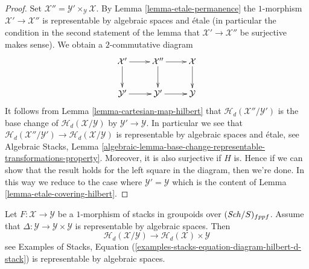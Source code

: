 \begin{proof}
Set $\mathcal{X}'' = \mathcal{Y}' \times_\mathcal{Y} \mathcal{X}$. By
Lemma \ref{lemma-etale-permanence}
the $1$-morphism $\mathcal{X}' \to \mathcal{X}''$ is representable by
algebraic spaces and \'etale (in particular the condition in the second
statement of the lemma that $\mathcal{X}' \to \mathcal{X}''$ be surjective
makes sense). We obtain a $2$-commutative diagram
$$
\xymatrix{
\mathcal{X}' \ar[r] \ar[d] &
\mathcal{X}'' \ar[r] \ar[d] &
\mathcal{X} \ar[d] \\
\mathcal{Y}' \ar[r] &
\mathcal{Y}' \ar[r] &
\mathcal{Y}
}
$$
It follows from
Lemma \ref{lemma-cartesian-map-hilbert}
that $\mathcal{H}_d(\mathcal{X}''/\mathcal{Y}')$ is the base change
of $\mathcal{H}_d(\mathcal{X}/\mathcal{Y})$ by $\mathcal{Y}' \to \mathcal{Y}$.
In particular we see that
$\mathcal{H}_d(\mathcal{X}''/\mathcal{Y}') \to
\mathcal{H}_d(\mathcal{X}/\mathcal{Y})$ is
representable by algebraic spaces and \'etale, see
Algebraic Stacks, Lemma
\ref{algebraic-lemma-base-change-representable-transformations-property}.
Moreover, it is also surjective if $H$ is.
 Hence if we can show that
the result holds for the left square in the diagram, then we're done.
In this way we reduce to the case where $\mathcal{Y}' = \mathcal{Y}$
which is the content of
Lemma \ref{lemma-etale-covering-hilbert}.
\end{proof}

\begin{lemma}
\label{lemma-relative-hilbert}
Let $F : \mathcal{X} \to \mathcal{Y}$ be a $1$-morphism of stacks in groupoids
over $(\mathit{Sch}/S)_{fppf}$. Assume that
$\Delta : \mathcal{Y} \to \mathcal{Y} \times \mathcal{Y}$
is representable by algebraic spaces. Then
$$
\mathcal{H}_d(\mathcal{X}/\mathcal{Y})
\longrightarrow
\mathcal{H}_d(\mathcal{X}) \times \mathcal{Y}
$$
see
Examples of Stacks, Equation
(\ref{examples-stacks-equation-diagram-hilbert-d-stack})
is representable by algebraic spaces.
\end{lemma}


